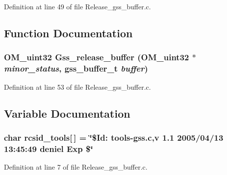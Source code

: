 Definition at line 49 of file Release\_\-gss\_\-buffer.c.

\subsection{Function Documentation}
\subsubsection{\setlength{\rightskip}{0pt plus 5cm}OM\_\-uint32 Gss\_\-release\_\-buffer (OM\_\-uint32 $\ast$ {\em minor\_\-status}, gss\_\-buffer\_\-t {\em buffer})}\label{Release__gss__buffer_8c_a22}




Definition at line 53 of file Release\_\-gss\_\-buffer.c.

\subsection{Variable Documentation}
\subsubsection{\setlength{\rightskip}{0pt plus 5cm}char {\bf rcsid\_\-tools}[$\,$] = \char`\"{}\$Id: tools-gss.c,v 1.1 2005/04/13 13:45:49 deniel Exp \$\char`\"{}}\label{Release__gss__buffer_8c_a21}




Definition at line 7 of file Release\_\-gss\_\-buffer.c.